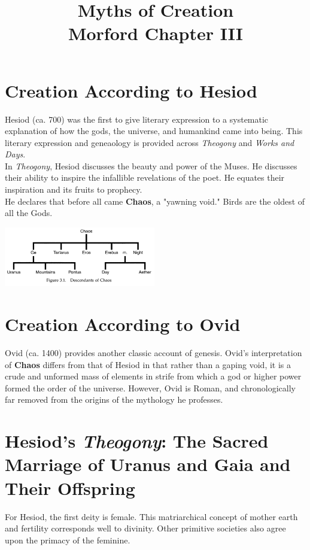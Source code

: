 \documentclass[11pt]{article}
\date{}
\title{Myths of Creation\\\medskip
\large Morford Chapter III}
\begin{document}
\maketitle

\section*{Creation According to Hesiod}
\label{sec:org08455b5}
Hesiod (ca. 700) was the first to give literary expression to a systematic explanation of how the gods, the universe, and humankind came into being. This literary expression and geneaology is provided across \emph{Theogony} and \emph{Works and Days}.\\

In \emph{Theogony}, Hesiod discusses the beauty and power of the Muses. He discusses their ability to inspire the infallible revelations of the poet. He equates their inspiration and its fruits to prophecy.\\

He declares that before all came \textbf{Chaos}, a "yawning void." Birds are the oldest of all the Gods.
\begin{center}
\includegraphics[width=250]{./descendants-of-chaos.png}
\end{center}

\section*{Creation According to Ovid}
\label{sec:org58a375e}
Ovid (ca. 1400) provides another classic account of genesis. Ovid's interpretation of \textbf{Chaos} differs from that of Hesiod in that rather than a gaping void, it is a crude and unformed mass of elements in strife from which a god or higher power formed the order of the universe. However, Ovid is Roman, and chronologically far removed from the origins of the mythology he professes.

\section*{Hesiod's \emph{Theogony}: The Sacred Marriage of Uranus and Gaia and Their Offspring}
\label{sec:org14c5336}
For Hesiod, the first deity is female. This matriarchical concept of mother earth and fertility corresponds well to divinity. Other primitive societies also agree upon the primacy of the feminine.\\
\end{document}
